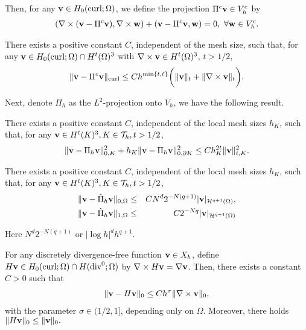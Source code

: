 \documentclass[final,leqno]{siamltex704}
\newcommand{\bv}{{\bf v}}
\def\bv{{\bf v}}
\def\bw{{\bf w}}
\begin{document}
Then, for any $\bv\in H_0(\text{curl};\Omega)$, we define the projection $\Pi^c\bv\in V_h^c$ by
\begin{eqnarray}
(\nabla\times(\bv-\Pi^c\bv),\nabla\times\bw)+(\bv-\Pi^c\bv,\bw)=0,\ \forall\bw\in V_h^c.
\end{eqnarray}

\begin{lemma}
There exists a positive constant $C$, independent of the mesh size, such that, for any $\bv\in H_0(\text{curl};\Omega)\cap H^t(\Omega)^3$ with $\nabla\times\bv\in H^t(\Omega)^3$, $t>1/2$,
\begin{eqnarray}
\|\bv-\Pi^c\bv\|_\text{curl}\le Ch^{\min\{t,\ell\}}\bigg(\|\bv\|_t+\|\nabla\times\bv\|_t\bigg).
\end{eqnarray}
\end{lemma}

Next, denote $\Pi_h$ as the $L^2$-projection onto $V_h$, we have the following result.
\begin{lemma}
There exists a positive constant $C$, independent of the local mesh sizes $h_K$, such that, for any $\bv\in H^t(K)^3, K\in\mathcal{T}_h, t>1/2$,
\begin{eqnarray}
\|\bv-\Pi_h\bv\|_{0,K}^2+h_K\|\bv-\Pi_h\bv\|_{0,\partial K}^2\le Ch_K^{2t}\|\bv\|_{t,K}^2.
\end{eqnarray}
\end{lemma}

\begin{lemma}
There exists a positive constant $C$, independent of the local mesh sizes $h_K$, such that, for any $\bv\in H^t(K)^3, K\in\mathcal{T}_h, t>1/2$,
\begin{eqnarray}
\|\bv-\hat{\Pi}_h\bv\|_{0,\Omega}&\le& CN^d2^{-N(q+1)}|\bv|_{\mathcal{H}^{q+1}(\Omega)},\\
\|\bv-\hat{\Pi}_h\bv\|_{1,\Omega}&\le& C2^{-Nq}|\bv|_{\mathcal{H}^{q+1}(\Omega)}
\end{eqnarray}
\end{lemma}

Here $N^d2^{-N(q+1)}$ or $|\log h|^d h^{q+1}$.

\begin{lemma}
For any discretely divergence-free function $\bv\in X_h$, define $H\bv\in H_0(\text{curl};\Omega)\cap H(\text{div}^0;\Omega)$ by $\nabla\times H\bv=\nabla\bv$. Then, there exists a constant $C>0$ such that
\begin{eqnarray}
\|\bv-H\bv\|_0\le Ch^{\sigma}\|\nabla\times\bv\|_0,
\end{eqnarray}
with the parameter $\sigma\in (1/2,1]$, depending only on $\Omega$. Moreover, there holds $\|H\bv\|_0\le \|\bv\|_0.$
\end{lemma}
\end{document}
